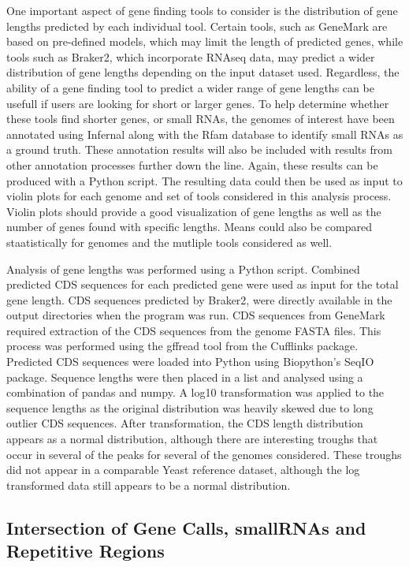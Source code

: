 One important aspect of gene finding tools to consider is the
distribution of gene lengths predicted by each individual
tool. Certain tools, such as GeneMark are based on pre-defined models,
which may limit the length of predicted genes, while tools such as
Braker2, which incorporate RNAseq data, may predict a wider
distribution of gene lengths depending on the input dataset
used. Regardless, the ability of a gene finding tool to predict a
wider range of gene lengths can be usefull if users are looking for
short or larger genes. To help determine whether these tools
find shorter genes, or small RNAs, the genomes of interest have been
annotated using Infernal along with the Rfam database to identify
small RNAs as a ground truth. These annotation results will also be
included with results from other annotation processes further down the
line. Again, these results can be produced with a Python script. The
resulting data could then be used as input to violin plots for each
genome and set of tools considered in this analysis process. Violin
plots should provide a good visualization of gene lengths as well as
the number of genes found with specific lengths. Means could also be
compared staatistically for genomes and the mutliple tools considered
as well.

Analysis of gene lengths was performed using a Python script. Combined
predicted CDS sequences for each predicted gene were used as input for
the total gene length. CDS sequences predicted by Braker2, were
directly available in the output directories when the program was
run. CDS sequences from GeneMark required extraction of the CDS
sequences from the genome FASTA files. This process was performed
using the gffread tool from the Cufflinks package. Predicted CDS
sequences were loaded into Python using Biopython's SeqIO
package. Sequence lengths were then placed in a list and analysed
using a combination of pandas and numpy. A log10 transformation was
applied to the sequence lengths as the original distribution was
heavily skewed due to long outlier CDS sequences. After
transformation, the CDS length distribution appears as a normal
distribution, although there are interesting troughs that occur in
several of the peaks for several of the genomes considered. These
troughs did not appear in a comparable Yeast reference dataset,
although the log transformed data still appears to be a normal
distribution.

\subsection{Intersection of Gene Calls, smallRNAs and Repetitive Regions}

